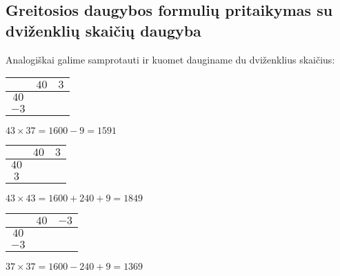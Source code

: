 \documentclass[a4paper]{article}
\newcommand{\high}[1]{\cellcolor{orange!80!white}{#1}}
\newcommand{\midd}[1]{\cellcolor{green!50!white}{#1}}
\newcommand{\low}[1]{\cellcolor{blue!50!white}{#1}}
\begin{document}
\subsection{Greitosios daugybos formulių pritaikymas su dviženklių skaičių daugyba}
Analogiškai galime samprotauti ir kuomet dauginame du dviženklius skaičius:
\newline\newline
\begin{minipage}[b]{0.3\linewidth}
\begin{center}
\begin{tabular}{c||c|c}
 & $40$ & $3$ \\ \hline \hline
 $40$ & \high{$1600$} & \midd{$120$}\\ \hline 
 $-3$ &  \midd{$-120$}  & \low{$-9$}
\end{tabular}
\newline\newline\newline
$43 \times 37 = 1600 - 9 = 1591$
\end{center}
\end{minipage}
\begin{minipage}[b]{0.3\linewidth}
\begin{center}
\begin{tabular}{c||c|c}
 & $40$ & $3$ \\ \hline \hline
 $40$ & \high{$1600$} & \midd{$120$}\\ \hline 
 $3$ &  \midd{$120$}  & \low{$9$}
\end{tabular}
\newline\newline\newline
$43 \times 43 = 1600 + 240 + 9 = 1849$
\end{center}
\end{minipage}
\begin{minipage}[b]{0.3\linewidth}
\begin{center}
\begin{tabular}{c||c|c}
 & $40$ & $-3$ \\ \hline \hline
 $40$ & \high{$1600$} & \midd{$-120$}\\ \hline 
 $-3$ &  \midd{$-120$}  & \low{$9$}
\end{tabular}
\newline\newline\newline
$37 \times 37 = 1600 - 240 + 9 = 1369$
\end{center}
\end{minipage}
\end{document}
